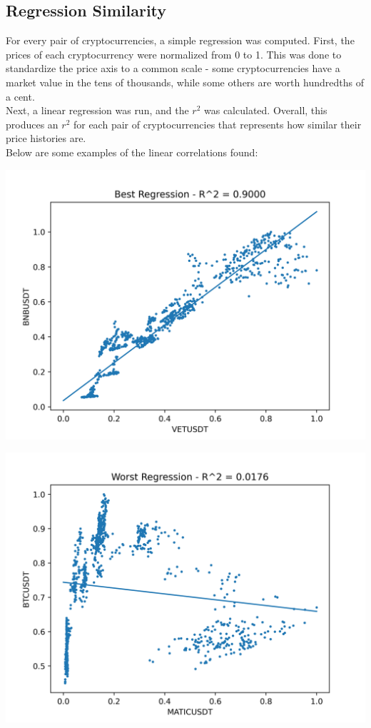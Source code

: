 \documentclass[11pt]{article}
\begin{document}
\subsection{Regression Similarity}
For every pair of cryptocurrencies, a simple regression was computed.  First, the prices of each cryptocurrency were normalized from 0 to 1.  This was done to standardize the price axis to a common scale - some cryptocurrencies have a market value in the tens of thousands, while some others are worth hundredths of a cent.\\[2mm]
Next, a linear regression was run, and the $r^{2}$ was calculated.  Overall, this produces an $r^{2}$ for each pair of cryptocurrencies that represents how similar their price histories are.\\[2mm]
Below are some examples of the linear correlations found:\\
\begin{minipage}{0.45\textwidth}
\includegraphics[scale=0.5]{best_reg.png}
\end{minipage}
\hfill
\begin{minipage}{0.45\textwidth}
\includegraphics[scale=0.5]{worst_reg.png}
\end{minipage}\\[2mm]
\end{document}
